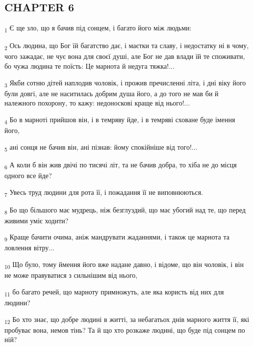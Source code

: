 \subsection{CHAPTER 6}
\begin{tcolorbox}
\textsubscript{1} Є ще зло, що я бачив під сонцем, і багато його між людьми:
\end{tcolorbox}
\begin{tcolorbox}
\textsubscript{2} Ось людина, що Бог їй багатство дає, і маєтки та славу, і недостатку ні в чому, чого зажадає, не чує вона для своєї душі, але Бог не дав влади їй те споживати, бо чужа людина те поїсть: Це марнота й недуга тяжка!...
\end{tcolorbox}
\begin{tcolorbox}
\textsubscript{3} Якби сотню дітей наплодив чоловік, і прожив пречисленні літа, і дні віку його були довгі, але не наситилась добрим душа його, а до того не мав би й належного похорону, то кажу: недоноскові краще від нього!...
\end{tcolorbox}
\begin{tcolorbox}
\textsubscript{4} Бо в марноті прийшов він, і в темряву йде, і в темряві сховане буде імення його,
\end{tcolorbox}
\begin{tcolorbox}
\textsubscript{5} ані сонця не бачив він, ані пізнав: йому спокійніше від того!...
\end{tcolorbox}
\begin{tcolorbox}
\textsubscript{6} А коли б він жив двічі по тисячі літ, та не бачив добра, то хіба не до місця одного все йде?
\end{tcolorbox}
\begin{tcolorbox}
\textsubscript{7} Увесь труд людини для рота її, і пожадання її не виповнюються.
\end{tcolorbox}
\begin{tcolorbox}
\textsubscript{8} Бо що більшого має мудрець, ніж безглуздий, що має убогий над те, що перед живими уміє ходити?
\end{tcolorbox}
\begin{tcolorbox}
\textsubscript{9} Краще бачити очима, аніж мандрувати жаданнями, і також це марнота та ловлення вітру...
\end{tcolorbox}
\begin{tcolorbox}
\textsubscript{10} Що було, тому ймення його вже надане давно, і відоме, що він чоловік, і він не може правуватися з сильнішим від нього,
\end{tcolorbox}
\begin{tcolorbox}
\textsubscript{11} бо багато речей, що марноту примножуть, але яка користь від них для людини?
\end{tcolorbox}
\begin{tcolorbox}
\textsubscript{12} Бо хто знає, що добре людині в житті, за небагатьох днів марного життя її, які пробуває вона, немов тінь? Та й що хто розкаже людині, що буде під сонцем по ній?
\end{tcolorbox}
